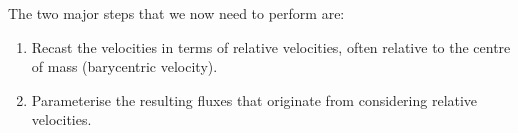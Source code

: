 \noindent The two major steps that we now need to perform are:
\begin{enumerate}
\item Recast the velocities in terms of relative velocities, often relative to the centre of mass (barycentric velocity).
\item Parameterise the resulting fluxes that originate from considering relative velocities.
\end{enumerate}
